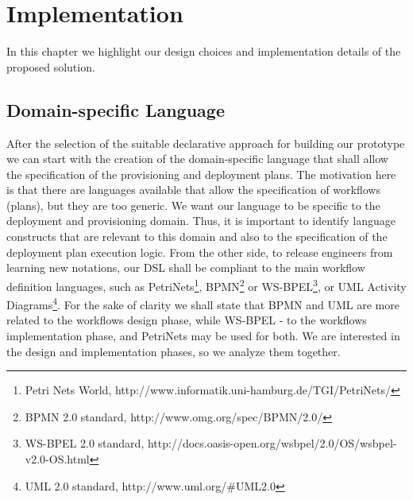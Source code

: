 
\chapter{Implementation} %

\label{Chapter3} %


\noindent In this chapter we highlight our design choices and implementation details of the proposed solution.

\section{Domain-specific Language}



\noindent After the selection of the suitable declarative approach for building our prototype we can start with the creation of the domain-specific language that shall allow the specification of the provisioning and deployment plans. The motivation here is that there are languages available that allow the specification of workflows (plans), but they are too generic. We want our language to be specific to the deployment and provisioning domain. Thus, it is important to identify language constructs that are relevant to this domain and also to the specification of the deployment plan execution logic. From the other side, to release engineers from learning new notations, our DSL shall be compliant to the main workflow definition languages, such as PetriNets\footnote{ Petri Nets World, $  $http://www.informatik.uni-hamburg.de/TGI/PetriNets/}, BPMN\footnote{ BPMN 2.0 standard, $  $http://www.omg.org/spec/BPMN/2.0/} or WS-BPEL\footnote{ WS-BPEL 2.0 standard, $  $http://docs.oasis-open.org/wsbpel/2.0/OS/wsbpel-v2.0-OS.html}, or UML Activity Diagrams\footnote{ UML 2.0 standard, $  $http://www.uml.org/\#UML2.0}. For the sake of clarity we shall state that BPMN and UML are more related to the workflows design phase, while WS-BPEL - to the workflows implementation phase, and PetriNets may be used for both. We are interested in the design and implementation phases, so we analyze them together.

